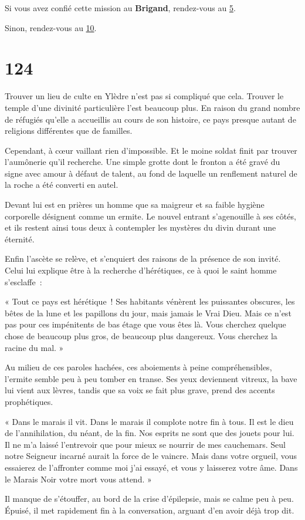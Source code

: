 \documentclass{report}
\newcommand{\gsection}[1]{
    \section{#1}
    \label{section-#1}
}
\newcommand{\glink}[1]{\hyperref[section-#1]{#1}}
\newcommand{\hero}[1]{\textbf{#1}}
\begin{document}
Si vous avez confié cette mission au \hero{Brigand}, rendez-vous au \glink{5}.

Sinon, rendez-vous au \glink{10}.

\gsection{124}

Trouver un lieu de culte en Ylèdre n'est pas si compliqué que cela. Trouver le temple d'une divinité particulière l'est beaucoup plus. En raison du grand nombre de réfugiés qu'elle a accueillis au cours de son histoire, ce pays presque autant de religions différentes que de familles.

Cependant, à cœur vaillant rien d'impossible. Et le moine soldat finit par trouver l'aumônerie qu'il recherche. Une simple grotte dont le fronton a été gravé du signe avec amour à défaut de talent, au fond de laquelle un renflement naturel de la roche a été converti en autel.

Devant lui est en prières un homme que sa maigreur et sa faible hygiène corporelle désignent comme un ermite. Le nouvel entrant s'agenouille à ses côtés, et ils restent ainsi tous deux à contempler les mystères du divin durant une éternité.

Enfin l'ascète se relève, et s'enquiert des raisons de la présence de son invité. Celui lui explique être à la recherche d'hérétiques, ce à quoi le saint homme s'esclaffe :

« Tout ce pays est hérétique ! Ses habitants vénèrent les puissantes obscures, les bêtes de la lune et les papillons du jour, mais jamais le Vrai Dieu. Mais ce n'est pas pour ces impénitents de bas étage que vous êtes là. Vous cherchez quelque chose de beaucoup plus gros, de beaucoup plus dangereux. Vous cherchez la racine du mal. »

Au milieu de ces paroles hachées, ces aboiements à peine compréhensibles, l'ermite semble peu à peu tomber en transe. Ses yeux deviennent vitreux, la bave lui vient aux lèvres, tandis que sa voix se fait plus grave, prend des accents prophétiques.

« Dans le marais il vit. Dans le marais il complote notre fin à tous. Il est le dieu de l'annihilation, du néant, de la fin. Nos esprits ne sont que des jouets pour lui. Il ne m'a laissé l'entrevoir que pour mieux se nourrir de mes cauchemars. Seul notre Seigneur incarné aurait la force de le vaincre. Mais dans votre orgueil, vous essaierez de l'affronter comme moi j'ai essayé, et vous y laisserez votre âme. Dans le Marais Noir votre mort vous attend. »

Il manque de s'étouffer, au bord de la crise d'épilepsie, mais se calme peu à peu. Épuisé, il met rapidement fin à la conversation, arguant d'en avoir déjà trop dit.
\end{document}

